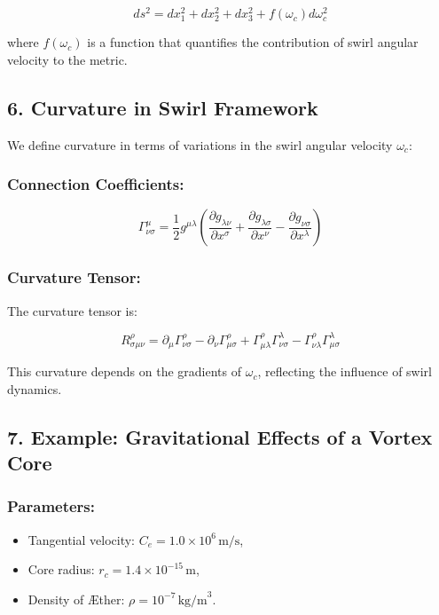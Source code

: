 {\[ds^2 = dx_1^2 + dx_2^2 + dx_3^2 + f(\omega_c) d\omega_c^2\]

where \(f(\omega_c)\) is a function that quantifies the contribution of swirl angular velocity to the metric.

\subsection*{6. Curvature in Swirl Framework}
We define curvature in terms of variations in the swirl angular velocity \(\omega_c\):

\subsubsection*{Connection Coefficients:}
\[\Gamma^\mu_{\nu\sigma} = \frac{1}{2} g^{\mu\lambda} \left( \frac{\partial g_{\lambda\nu}}{\partial x^\sigma} + \frac{\partial g_{\lambda\sigma}}{\partial x^\nu} - \frac{\partial g_{\nu\sigma}}{\partial x^\lambda} \right)\]

\subsubsection*{Curvature Tensor:}
The curvature tensor is:

\[R^\rho_{\sigma\mu\nu} = \partial_\mu \Gamma^\rho_{\nu\sigma} - \partial_\nu \Gamma^\rho_{\mu\sigma} + \Gamma^\rho_{\mu\lambda} \Gamma^\lambda_{\nu\sigma} - \Gamma^\rho_{\nu\lambda} \Gamma^\lambda_{\mu\sigma}\]

This curvature depends on the gradients of \(\omega_c\), reflecting the influence of swirl dynamics.

\subsection*{7. Example: Gravitational Effects of a Vortex Core}
\subsubsection*{Parameters:}
\begin{itemize}
\item Tangential velocity: \(C_e = 1.0 \times 10^6 \, \text{m/s}\),

\item Core radius: \(r_c = 1.4 \times 10^{-15} \, \text{m}\),

\item Density of \AE ther: \(\rho = 10^{-7} \, \text{kg/m}^3\).
\end{itemize}
}
